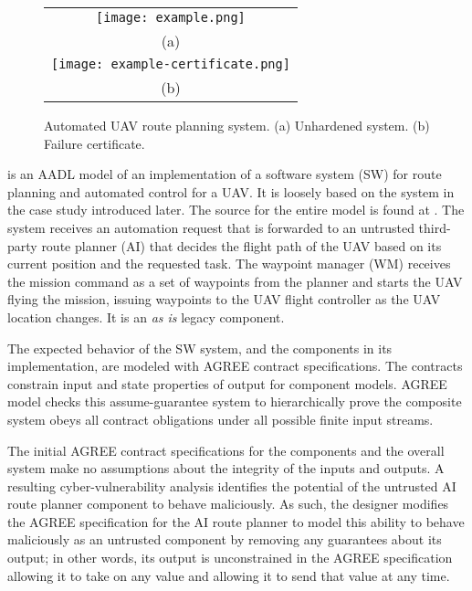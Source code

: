 \begin{figure*}
  \begin{center}
    \begin{tabular}{c}
      \texttt{[image: example.png]} \\
      (a) \\
      \texttt{[image: example-certificate.png]} \\
      (b)
    \end{tabular}
  \end{center}
\caption{Automated UAV route planning system. (a) Unhardened system. (b) Failure certificate.}
\label{fig:example}
\end{figure*}

 is an AADL model of an implementation of a software system (SW) for route planning and automated control for a UAV. It is loosely based on the system in the case study introduced later.  The source for the entire model is found at \cite{repo}. The system receives an automation request that is forwarded to an untrusted third-party route planner (AI) that decides the flight path of the UAV based on its current position and the requested task. The waypoint manager (WM) receives the mission command as a set of waypoints from the planner and starts the UAV flying the mission, issuing waypoints to the UAV flight controller as the UAV location changes. It is an \emph{as is} legacy component.

The expected behavior of the SW system, and the components in its implementation, are modeled with AGREE contract specifications. The contracts constrain input and state properties of output for component models. AGREE model checks this assume-guarantee system to hierarchically prove the composite system obeys all contract obligations under all possible finite input streams. 

The initial AGREE contract specifications for the components and the overall system make no assumptions about the integrity of the inputs and outputs. A resulting cyber-vulnerability analysis identifies the potential of the untrusted AI route planner component to behave maliciously. As such, the designer modifies the AGREE specification for the AI route planner to model this ability to behave maliciously as an untrusted component by removing any guarantees about its output; in other words, its output is unconstrained in the AGREE specification allowing it to take on any value and allowing it to send that value at any time.

